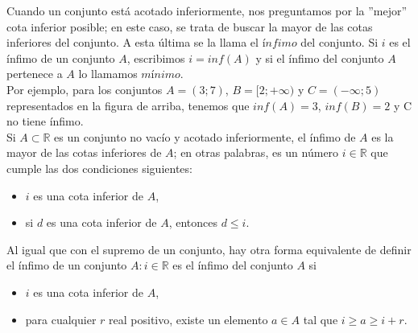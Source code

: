 \documentclass[Análisis.root.tex]{subfiles}
\newcommand{\R}{\mathbb{R}}
\begin{document}
        \begin{center}
            \begin{scaletikzpicturetowidth}{0.5\linewidth}
            \end{scaletikzpicturetowidth}
        \end{center}
        Cuando un conjunto está acotado inferiormente, nos preguntamos por la ”mejor” cota inferior posible; en este caso, se trata de buscar la mayor de las cotas inferiores del conjunto. A esta última se la llama el \(\textit{ínfimo}\) del conjunto. Si \(i\) es el ínfimo de un conjunto \(A\), escribimos \(i = inf(A)\) y si el ínfimo del conjunto \(A\) pertenece a \(A\) lo llamamos \(\textit{mínimo}\).\\
        Por ejemplo, para los conjuntos \(A = (3; 7)\), \(B = [2; +\infty)\) y \(C = (−\infty; 5)\) representados en la figura de arriba, tenemos que \(inf(A) = 3\), \(inf(B) = 2\) y C no tiene ínfimo.\\
        Si \(A \subset \R\) es un conjunto no vacío y acotado inferiormente, el ínfimo de \(A\) es la mayor de las cotas inferiores de \(A\); en otras palabras, es un número \(i \in \R\) que cumple las dos condiciones siguientes:
        \begin{itemize}
            \item \(i\) es una cota inferior de \(A\),
            \item si \(d\) es una cota inferior de \(A\), entonces \(d \leq i\).
        \end{itemize}
        Al igual que con el supremo de un conjunto, hay otra forma equivalente de definir el ínfimo de un conjunto \(A: i \in \R\) es el ínfimo del conjunto \(A\) si
        \begin{itemize}
            \item \(i\) es una cota inferior de \(A\),
            \item para cualquier \(r\) real positivo, existe un elemento \(a \in A\) tal que \(i \geq a \geq i + r\).
        \end{itemize}
\end{document}
